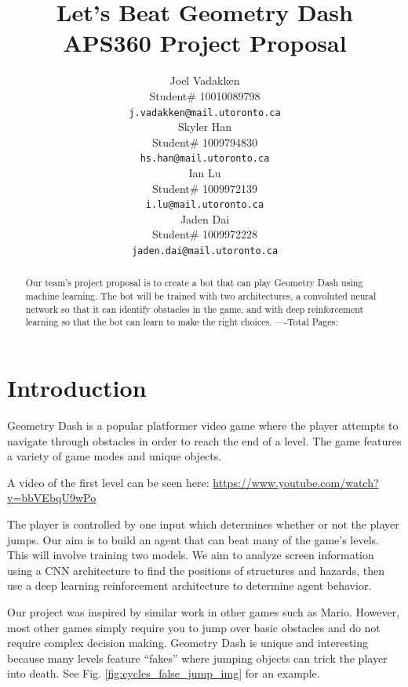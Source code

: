 \documentclass{article} %
\title{Let's Beat Geometry Dash  \\ 
APS360 Project Proposal}
\author{Joel Vadakken  \\
Student\# 10010089798\\
\texttt{j.vadakken@mail.utoronto.ca} \\
\And
Skyler Han  \\
Student\# 1009794830 \\
\texttt{hs.han@mail.utoronto.ca} \\
\AND
Ian Lu  \\
Student\# 1009972139 \\
\texttt{i.lu@mail.utoronto.ca} \\
\And
Jaden Dai \\
Student\# 1009972228 \\
\texttt{jaden.dai@mail.utoronto.ca} \\
\AND
}
\begin{document}
\maketitle

\begin{abstract}
Our team's project proposal is to create a bot that can play 
Geometry Dash using machine learning. The bot will be trained
with two architectures, a convoluted neural network so that it
can identify obstacles in the game, and with deep reinforcement
learning so that the bot can learn to make the right choices.
----Total Pages: \pageref{last_page}
\end{abstract}



\section{Introduction}

Geometry Dash is a popular platformer video game 
where the player attempts to navigate through 
obstacles in order to reach the end of a level. 
The game features a variety of game modes and 
unique objects.

A video of the first level can be seen here:
\href{https://www.youtube.com/watch?v=bbVEbqU9wPo}{https://www.youtube.com/watch?v=bbVEbqU9wPo} 

The player is controlled by one input which 
determines whether or not the player jumps. 
Our aim is to build an agent that can beat many 
of the game’s levels. This will involve training 
two models. We aim to analyze screen information 
using a CNN architecture to find the positions 
of structures and hazards, then use a deep 
learning reinforcement architecture to determine 
agent behavior.

Our project was inspired by similar work in other
games such as Mario. However, most other games simply 
require you to jump over basic obstacles and do not require 
complex decision making. Geometry Dash is unique and 
interesting because many levels feature “fakes” 
where jumping objects can trick the player into death.
See Fig. \ref{fig:cycles_false_jump_img} for an example. 
\end{document}

